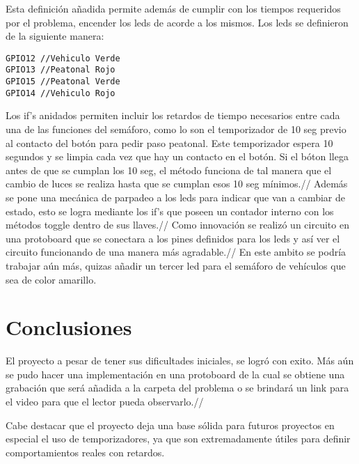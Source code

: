 \documentclass[letterpaper]{article}
\begin{document}
Esta definición añadida permite además de cumplir con los tiempos requeridos por el problema, encender los leds de acorde a los mismos. Los leds se definieron de la siguiente manera:
\begin{lstlisting}
GPIO12 //Vehiculo Verde
GPIO13 //Peatonal Rojo
GPIO15 //Peatonal Verde
GPIO14 //Vehiculo Rojo
\end{lstlisting}

Los if's anidados permiten incluir los retardos de tiempo necesarios entre cada una de las funciones del semáforo, como lo son el temporizador de 10 seg previo al contacto del botón para pedir paso peatonal. Este temporizador espera 10 segundos y se limpia cada vez que hay un contacto en el botón. Si el bóton llega antes de que se cumplan los 10 seg, el método funciona de tal manera que el cambio de luces se realiza hasta que se cumplan esos 10 seg mínimos.//
Además se pone una mecánica de parpadeo a los leds para indicar que van a cambiar de estado, esto se logra mediante los if's que poseen un contador interno con los métodos toggle dentro de sus llaves.//
Como innovación se realizó un circuito en una protoboard que se conectara a los pines definidos para los leds y así ver el circuito funcionando de una manera más agradable.//
En este ambito se podría trabajar aún más, quizas añadir un tercer led para el semáforo de vehículos que sea de color amarillo.

\section{Conclusiones}

El proyecto a pesar de tener sus dificultades iniciales, se logró con exito. Más aún se pudo hacer una implementación en una protoboard de la cual se obtiene una grabación que será añadida a la carpeta del problema o se brindará un link para el video para que el lector pueda observarlo.//

Cabe destacar que el proyecto deja una base sólida para futuros proyectos en especial el uso de temporizadores, ya que son extremadamente útiles para definir comportamientos reales con retardos. 



 

\end{document}
